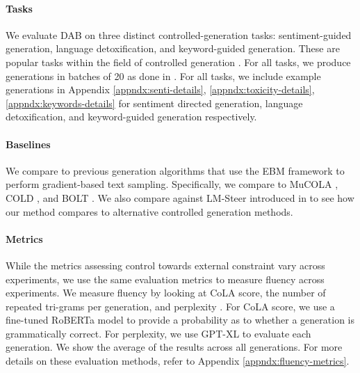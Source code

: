 \paragraph{Tasks} We evaluate DAB on three distinct controlled-generation tasks: sentiment-guided generation, language detoxification, and keyword-guided generation. These are popular tasks within the field of controlled generation \citep{kumar2022gradient, liu2023bolt, han2023lm}. For all tasks, we produce generations in batches of 20 as done in \citet{liu2023bolt}. For all tasks, we include example generations in Appendix \ref{appndx:senti-details}, \ref{appndx:toxicity-details}, \ref{appndx:keywords-details} for sentiment directed generation, language detoxification, and keyword-guided generation respectively. 

\paragraph{Baselines} We compare to previous generation algorithms that use the EBM framework to perform gradient-based text sampling. Specifically, we compare to MuCOLA \citep{kumar2022gradient}, COLD \citep{qin2022cold}, and BOLT \citep{liu2023bolt}. We also compare against LM-Steer introduced in \citep{han2023lm} to see how our method compares to alternative controlled generation methods. 

\paragraph{Metrics} While the metrics assessing control towards external constraint vary across experiments, we use the same evaluation metrics to measure fluency across experiments. We measure fluency by looking at CoLA score, the number of repeated tri-grams per generation, and perplexity \citep{kumar2022gradient, liu2023bolt}. 
For CoLA score, we use a fine-tuned RoBERTa model to provide a probability as to whether a generation is grammatically correct.
For perplexity, we use GPT-XL to evaluate each generation. 
We show the average of the results across all generations. For more details on these evaluation methods, refer to Appendix \ref{appndx:fluency-metrics}. 